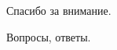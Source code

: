\documentclass[xcolor=pdftex, dvipsnames, table]{beamer}
\begin{document}
\begin{frame}
  \begin{center}
    \begin{huge}
      Спасибо за внимание.
    \end{huge}

    Вопросы, ответы.
  \end{center}
\end{frame}
\end{document}
